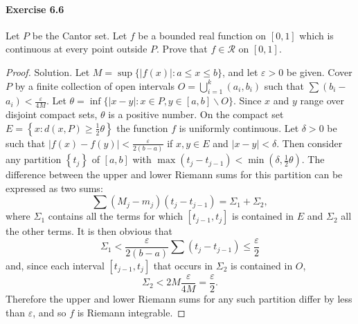 \documentclass{article}
\theoremstyle{definition}
\begin{document}
\paragraph{Exercise 6.6} Let $P$ be the Cantor set. Let $f$ be a bounded real function on $[0,1]$ which is continuous at every point outside $P$. Prove that $f \in \mathcal{R}$ on $[0,1]$.
\begin{proof}
    Solution. Let $M=\sup \{|f(x)|: a \leq x \leq b\}$, and let $\varepsilon>0$ be given. Cover $P$ by a finite collection of open intervals $O=\bigcup_{i=1}^k\left(a_i, b_i\right)$ such that $\sum\left(b_i-\right.$ $\left.a_i\right)<\frac{\varepsilon}{4 M}$. Let $\theta=\inf \{|x-y|: x \in P, y \in[a, b] \backslash O\}$. Since $x$ and $y$ range over disjoint compact sets, $\theta$ is a positive number. On the compact set $E=\left\{x: d(x, P) \geq \frac{1}{2} \theta\right\}$ the function $f$ is uniformly continuous. Let $\delta>0$ be such that $|f(x)-f(y)|<\frac{\varepsilon}{2(b-a)}$ if $x, y \in E$ and $|x-y|<\delta$. Then consider any partition $\left\{t_j\right\}$ of $[a, b]$ with $\max \left(t_j-t_{j-1}\right)<\min \left(\delta, \frac{1}{2} \theta\right)$. The difference between the upper and lower Riemann sums for this partition can be expressed as two sums:
$$
\sum\left(M_j-m_j\right)\left(t_j-t_{j-1}\right)=\Sigma_1+\Sigma_2,
$$
where $\Sigma_1$ contains all the terms for which $\left[t_{j-1}, t_j\right]$ is contained in $E$ and $\Sigma_2$ all the other terms. It is then obvious that
$$
\Sigma_1<\frac{\varepsilon}{2(b-a)} \sum\left(t_j-t_{j-1}\right) \leq \frac{\varepsilon}{2}
$$
and, since each interval $\left[t_{j-1}, t_j\right]$ that occurs in $\Sigma_2$ is contained in $O$,
$$
\Sigma_2<2 M \frac{\varepsilon}{4 M}=\frac{\varepsilon}{2} .
$$
Therefore the upper and lower Riemann sums for any such partition differ by less than $\varepsilon$, and so $f$ is Riemann integrable.
\end{proof}
\end{document}
